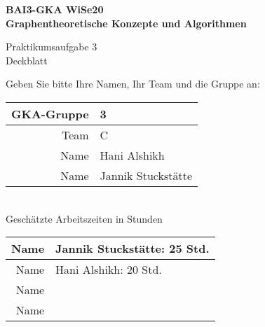 

\thispagestyle{empty}
\begin{center}

	{\large {\bf   BAI3-GKA WiSe20 \\ Graphentheoretische Konzepte und Algorithmen \\[5mm]} }

	{\huge Praktikumsaufgabe 3  \\[5mm] Deckblatt}\\

\end{center}
Geben Sie bitte Ihre Namen, Ihr Team und die Gruppe  an:\\ \hspace*{2cm}
\begin{tabular}[t]{|r|l|}
	\hline
	GKA-Gruppe & 3                 \raisebox{-3mm}{\rule[8mm]{20mm}{0mm} }                   \\ \hline
	Team       & C                   \raisebox{-3mm}{\rule[8mm]{20mm}{0mm} }                 \\ \hline
	Name       & Hani Alshikh                 \raisebox{-3mm}{\rule[8mm]{20mm}{0mm} }        \\ \hline
	Name       & Jannik Stuckstätte                  \raisebox{-3mm}{\rule[8mm]{20mm}{0mm} } \\ \hline
\end{tabular}
~\\[14mm]
Geschätzte Arbeitszeiten in Stunden\\ \hspace*{2cm}
\begin{tabular}[t]{|r|l|}
	\hline
	Name & Jannik Stuckstätte: 25 Std. \raisebox{-3mm}{\rule[8mm]{20mm}{0mm} } \\ \hline
	Name & Hani Alshikh: 20 Std. \raisebox{-3mm}{\rule[8mm]{20mm}{0mm} }                              \\ \hline
	Name & \raisebox{-3mm}{\rule[8mm]{20mm}{0mm} }                              \\ \hline
	Name & \raisebox{-3mm}{\rule[8mm]{20mm}{0mm} }                              \\ \hline
\end{tabular}
~\\[4mm]


\vfill
